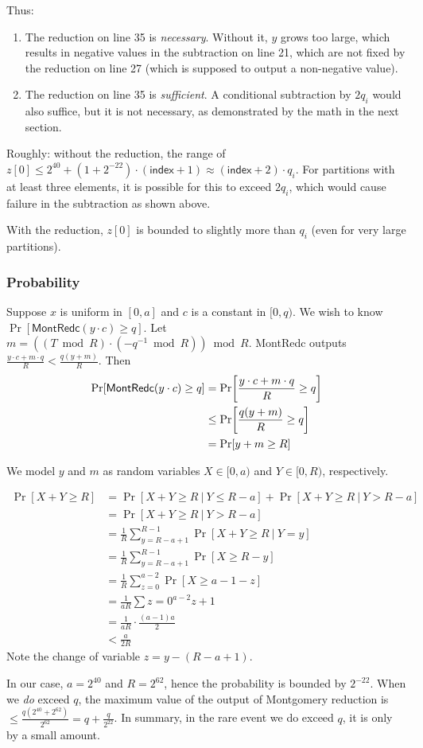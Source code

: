\documentclass{article}
\begin{document}
Thus:
\begin{enumerate}
    \item The reduction on line 35 is \emph{necessary}. Without it, $y$ grows too large, which results in negative values in the subtraction on line 21, which are not fixed by the reduction on line 27 (which is supposed to output a non-negative value).
    \item The reduction on line 35 is \emph{sufficient}. A conditional subtraction by $2q_i$ would also suffice, but it is not necessary, as demonstrated by the math in the next section. 
\end{enumerate}

Roughly: without the reduction, the range of $z[0] \le 2^{40}+(1+2^{-22})\cdot(\mathsf{index}+1)\approx (\mathsf{index}+2)\cdot q_i$. For partitions with at least three elements, it is possible for this to exceed $2q_i$, which would cause failure in the subtraction as shown above.

With the reduction, $z[0]$ is bounded to slightly more than $q_i$ (even for very large partitions).

\subsubsection{Probability}
Suppose $x$ is uniform in $[0, a]$ and $c$ is a constant in $[0, q)$. We wish to know $\Pr[\mathsf{MontRedc}(y\cdot c) \ge q]$. 
Let $m=((T\bmod R)\cdot (-q^{-1}\bmod R))\bmod R$. \textsf{MontRedc} outputs $\frac{y\cdot c + m\cdot q}{R} < \frac{q(y+m)}{R}$. Then
\begin{align}
    \Pr[\mathsf{MontRedc}(y\cdot c) \ge q] &= \Pr\bracks*{\frac{y\cdot c + m\cdot q}{R} \ge q} \\
    &\le \Pr\bracks*{\frac{q(y+m)}{R} \ge q} \\
    &= \Pr[y+m\ge R]
\end{align}

We model $y$ and $m$ as random variables $X\in[0, a)$ and $Y\in[0,R)$, respectively.

\begin{align}
    \Pr[X+Y\ge R] &= \Pr[X+Y\ge R\ |\ Y\le R-a] + \Pr[X+Y\ge R\ |\ Y> R-a]\\
    &= \Pr[X+Y\ge R\ |\ Y> R-a] \\
    &= \frac{1}{R}\sum_{y=R-a+1}^{R-1}\Pr[X+Y\ge R\ |\ Y=y] \\
    &= \frac{1}{R}\sum_{y=R-a+1}^{R-1}\Pr[X\ge R-y] \\
    &= \frac{1}{R}\sum_{z=0}^{a-2}\Pr[X\ge a-1-z] \\
    &= \frac{1}{aR}\sum{z=0}^{a-2}{z+1} \\
    &= \frac{1}{aR}\cdot\frac{(a-1)a}{2} \\
    &< \frac{a}{2R}
\end{align}
Note the change of variable $z=y-(R-a+1)$.

In our case, $a=2^{40}$ and $R=2^{62}$, hence the probability is bounded by $2^{-22}$. When we \emph{do} exceed $q$, the maximum value of the output of Montgomery reduction is $\le \frac{q(2^{40}+2^{62})}{2^{62}}=q+\frac{q}{2^{22}}$. In summary, in the rare event we do exceed $q$, it is only by a small amount.
\end{document}
